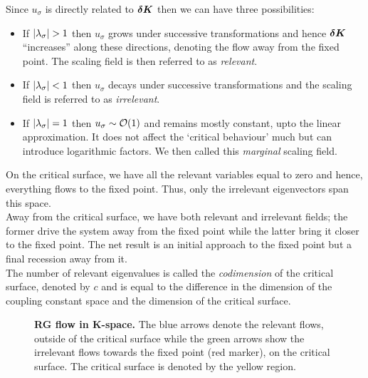 Since $u_{\sigma}$ is directly related to $\boldsymbol{\delta K}$ then we can have three possibilities:
\begin{itemize}
    \item[\triangleright] If $\abs{\lambda_{\sigma}}>1$ then $u_{\sigma}$ grows under successive transformations and hence $\boldsymbol{\delta K}$ ``increases'' along these directions, denoting the flow away from the fixed point. The scaling field is then referred to as \textit{relevant}. 
    \item[\triangleright]  If $\abs{\lambda_{\sigma}}<1$ then $u_{\sigma}$ decays under successive transformations and the scaling field is referred to as \textit{irrelevant}.
    \item[\triangleright] If $\abs{\lambda_{\sigma}}=1$ then $u_{\sigma} \sim \mathcal O(1)$ and remains mostly constant, upto the linear approximation. It does not affect the `critical behaviour' much but can introduce logarithmic factors. We then called this \textit{marginal} scaling field.
\end{itemize}
On the critical surface, we have all the relevant variables equal to zero and hence, everything flows to the fixed point. Thus, only the irrelevant eigenvectors span this space.\\[0.2cm]
Away from the critical surface, we have both relevant and irrelevant fields; the former drive the system away from the fixed point while the latter bring it closer to the fixed point. The net result is an initial approach to the fixed point but a final recession away from it.\\[0.2cm]
The number of relevant eigenvalues is called the \textit{codimension} of the critical surface, denoted by $c$ and is equal to the difference in the dimension of the coupling constant space and the dimension of the critical surface. 
\begin{figure}[t]
    \centering 
    
    \caption{\textbf{RG flow in K-space.} The blue arrows denote the relevant flows, outside of the critical surface while the green arrows show the irrelevant flows towards the fixed point (red marker), on the critical surface. The critical surface is denoted by the yellow region.}
\end{figure}

